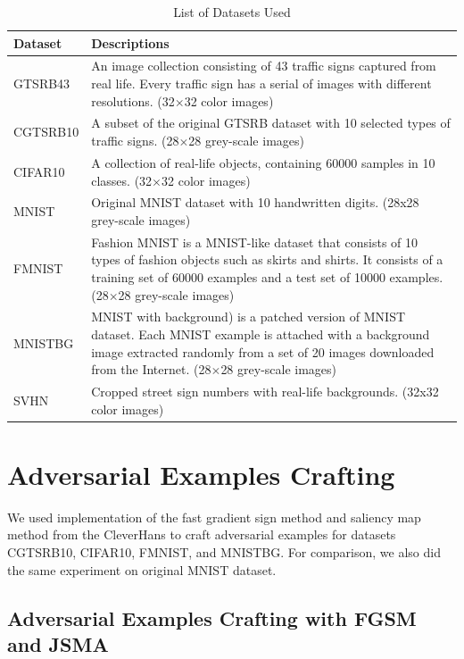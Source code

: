\documentclass{article}
\begin{document}
\begin{table}[htb]
    \centering
    \begin{tabular}{ | C{0.15\textwidth} | C{0.83\textwidth} | }
    \toprule
    Dataset & Descriptions \\
    \midrule
    GTSRB43 & An image collection consisting of 43 traffic signs captured from real life. Every traffic sign has a serial of images with different resolutions. (32$\times$32 color images) \\ \midrule
    CGTSRB10 & A subset of the original GTSRB\cite{gtsrb} dataset with 10 selected types of traffic signs. (28$\times$28 grey-scale images) \\ \midrule
    CIFAR10 & A collection of real-life objects\cite{cifar10}, containing 60000 samples in 10 classes. (32$\times$32 color images) \\ \midrule
    MNIST & Original MNIST\cite{mnist} dataset with 10 handwritten digits. (28x28 grey-scale images) \\ \midrule
    FMNIST & Fashion MNIST\cite{fmnist} is a MNIST-like dataset that consists of 10 types of fashion objects such as skirts and shirts. It consists of a training set of 60000 examples and a test set of 10000 examples. (28$\times$28 grey-scale images) \\ \midrule
    MNISTBG & MNIST with background)\cite{mnistbg} is a patched version of MNIST dataset. Each MNIST example is attached with a background image extracted randomly from a set of 20 images downloaded from the Internet. (28$\times$28 grey-scale images) \\ \midrule
    SVHN & Cropped street sign numbers with real-life backgrounds\cite{svhn}. (32x32 color images) \\
    \bottomrule
    \end{tabular}
    \caption{\label{tab:datasetused} List of Datasets Used}
\end{table}

\section{Adversarial Examples Crafting}

We used implementation of the fast gradient sign method and saliency map method from the CleverHans\cite{cleverhans} to craft
adversarial examples for datasets CGTSRB10, CIFAR10, FMNIST, and MNISTBG.
For comparison, we also did the same experiment on original MNIST dataset.


\subsection{Adversarial Examples Crafting with FGSM and JSMA}
\end{document}
